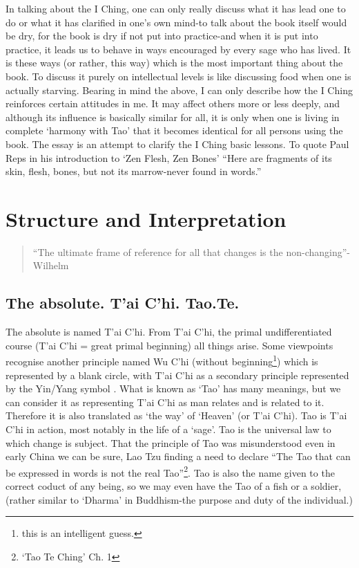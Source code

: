 \documentclass[11pt]{book}
\begin{document}
In talking about the I Ching, one can only really discuss what it has lead one to do or what it has clarified in one's own mind-to talk about the book itself would be dry, for the book is dry if not put into practice-and when it is put into practice, it leads us to behave in ways encouraged by every sage who has lived. It is these ways (or rather, this way) which is the most important thing about the book. To discuss it purely on intellectual levels is like discussing food when one is actually starving. Bearing in mind the above, I can only describe how the I Ching reinforces certain attitudes in me. It may affect others more or less deeply, and although its influence is basically similar for all, it is only when one is living in complete `harmony with Tao' that it becomes identical for all persons using the book. The essay is an attempt to clarify the I Ching basic lessons. To quote Paul Reps in his introduction to `Zen Flesh, Zen Bones' ``Here are fragments of its skin, flesh, bones, but not its marrow-never found in words.''


\section{Structure and Interpretation}

\begin{quote}
  ``The ultimate frame of reference for all that changes is the non-changing''-Wilhelm
\end{quote}


\subsection{The absolute. T'ai C'hi. Tao.Te.}

The absolute is named T'ai C'hi. From T'ai C'hi, the primal undifferentiated course (T'ai C'hi = great primal beginning) all things arise. Some viewpoints recognise another principle named Wu C'hi (without beginning\footnote{this is an intelligent guess.}) which is represented by a blank circle, with T'ai C'hi as a secondary principle represented by the Yin/Yang symbol \Yinyang. What is known as `Tao' has many meanings, but we can consider it as representing T'ai C'hi as man relates and is related to it. Therefore it is also translated as `the way' of `Heaven' (or T'ai C'hi). Tao is T'ai C'hi in action, most notably in the life of a `sage'. Tao is the universal law to which change is subject. That the principle of Tao was misunderstood even in early China we can be sure, Lao Tzu finding a need to declare ``The Tao that can be expressed in words is not the real Tao''\footnote{`Tao Te Ching' Ch. 1}. Tao is also the name given to the correct coduct of any being, so we may even have the Tao of a fish or a soldier, (rather similar to `Dharma' in Buddhism-the purpose and duty of the individual.)
\end{document}
